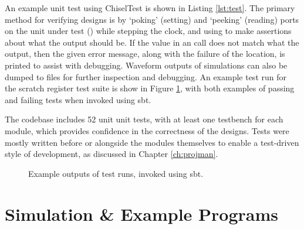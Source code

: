 An example unit test using ChiselTest is shown in Listing \ref{lst:test}. The primary method for verifying designs is by `poking' (setting) and `peeking' (reading) ports on the unit under test () while stepping the clock, and using  to make assertions about what the output should be. If the value in an  call does not match what the output, then the given error message, along with the failure of the location, is printed to assist with debugging. Waveform outputs of simulations can also be dumped to files for further inspection and debugging. An example test run for the scratch register test suite is show in Figure \ref{fig:testrun}, with both examples of passing and failing tests when invoked using sbt.

The codebase includes 52 unit unit tests, with at least one testbench for each module, which provides confidence in the correctness of the designs. Tests were mostly written before or alongside the modules themselves to enable a test-driven style of development, as discussed in Chapter \ref{ch:projman}.

\begin{figure}[H]
    \centering
    \qquad
    \caption{Example outputs of test runs, invoked using sbt.}
    \label{fig:testrun}
\end{figure}


\section{Simulation \& Example Programs}
\label{sec:simulations}

